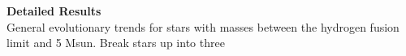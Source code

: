 \textbf{Detailed Results} \\
General evolutionary trends for stars with masses between the hydrogen fusion limit and 5 Msun. Break stars up into three 